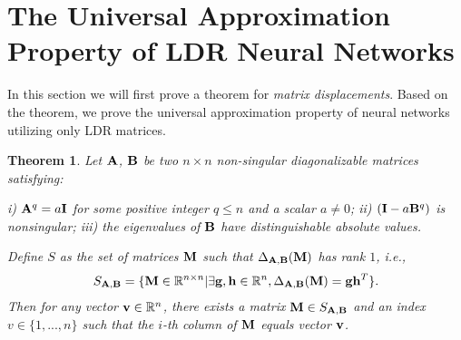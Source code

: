 \documentclass{article}
\newtheorem{theorem}{Theorem}[section]
\begin{document}
\section{The Universal Approximation Property of LDR Neural Networks}
\label{suap}
In this section we will first prove a theorem for \emph{matrix displacements}. Based on the theorem, we prove the universal approximation property of neural networks utilizing only LDR matrices.
\begin{theorem}
\label{tdist}
Let $\mathrm{\bf{A}}$, ${\mathrm{\bf B}}$ be two $n\times n$ non-singular diagonalizable matrices satisfying:

i) ${\mathrm{\bf A}}^q = a{\mathrm{\bf I}}$ for some positive integer $q\le n$ and a scalar $a\neq 0$;
ii) $({\mathrm{\bf I}} - a\mathbf{B}^q)$ is nonsingular;
iii) the eigenvalues of ${\mathbf{\bf B}}$ have distinguishable absolute values.

Define $S$ as the set of matrices ${\mathrm{\bf M}}$ such that $\Delta_{{\mathrm{\bf A}},{\mathrm{\bf B}}}({\mathrm{\bf M}})$ has rank $1$, i.e.,
\begin{equation}
\label{es}
\aligned
S_{{\mathrm{\bf A}},{\mathrm{\bf B}}} = \{{\mathrm{\bf M}}\in\mathbb{R}^{n\times n}|\exists\mathrm{\bf g, h}\in\mathbb{R}^n, \Delta_{{\mathrm{\bf A}},{\mathrm{\bf B}}}( {\mathrm{\bf M}}) = {\mathrm{\bf gh}}^T  \}.
 \endaligned
\end{equation}
Then for any vector ${\mathrm{\bf v}}\in\mathbb{R}^n$, there exists a matrix ${\mathrm{\bf M}}\in S_{{\mathrm{\bf A}},{\mathrm{\bf B}}}$ and an index $v\in\{1,...,n\}$ such that the $i$-th column of ${\mathrm{\bf M}}$ equals vector ${\mathrm{\bf v}}$.
\end{theorem}
\end{document}
